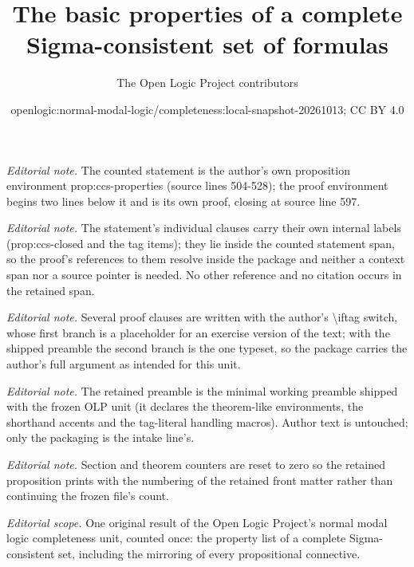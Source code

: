 \documentclass[10pt,a4paper]{article}
\title{The basic properties of a complete Sigma-consistent set of formulas}
\author{The Open Logic Project contributors}
\date{openlogic:normal-modal-logic/completeness:local-snapshot-20261013; CC BY 4.0}
\theoremstyle{plain}
\theoremstyle{definition}
\theoremstyle{remark}
\begin{document}
\maketitle
\setcounter{section}{0}
\setcounter{thm}{0}
\noindent\textit{Editorial note.} The counted statement is the author's own proposition environment prop:ccs-properties (source lines 504-528); the proof environment begins two lines below it and is its own proof, closing at source line 597.\par\medskip
\noindent\textit{Editorial note.} The statement's individual clauses carry their own internal labels (prop:ccs-closed and the tag items); they lie inside the counted statement span, so the proof's references to them resolve inside the package and neither a context span nor a source pointer is needed. No other reference and no citation occurs in the retained span.\par\medskip
\noindent\textit{Editorial note.} Several proof clauses are written with the author's \textbackslash{}iftag switch, whose first branch is a placeholder for an exercise version of the text; with the shipped preamble the second branch is the one typeset, so the package carries the author's full argument as intended for this unit.\par\medskip
\noindent\textit{Editorial note.} The retained preamble is the minimal working preamble shipped with the frozen OLP unit (it declares the theorem-like environments, the shorthand accents and the tag-literal handling macros). Author text is untouched; only the packaging is the intake line's.\par\medskip
\noindent\textit{Editorial note.} Section and theorem counters are reset to zero so the retained proposition prints with the numbering of the retained front matter rather than continuing the frozen file's count.\par\medskip
\noindent\textit{Editorial scope.} One original result of the Open Logic Project's normal modal logic completeness unit, counted once: the property list of a complete Sigma-consistent set, including the mirroring of every propositional connective.\par\medskip
\end{document}
